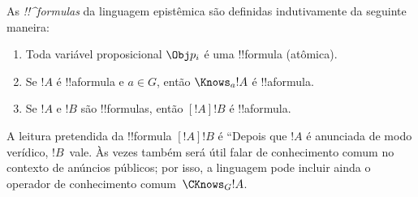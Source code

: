 \documentclass[../../../include/open-logic-section]{subfiles}
\begin{document}
\begin{defn}
  As \emph{!!^{formula}s} da linguagem epistêmica são definidas
  indutivamente da seguinte maneira:
  \begin{enumerate}


  \item Toda variável proposicional $\Obj p_i$ é uma !!{formula}
  (atômica).






  \item Se $!A$ é !!a{formula} e $a \in G$, então $\Knows_a !A$ é
  !!a{formula}.
  
  \item Se $!A$ e $!B$ são !!{formula}s, então $[!A] !B$ é !!a{formula}.

\end{enumerate}
\end{defn}

A leitura pretendida da !!{formula} $[!A] !B$ é ``Depois que $!A$ é
anunciada de modo verídico, $!B$~vale. Às vezes também será útil falar
de conhecimento comum no contexto de anúncios públicos; por isso, a
linguagem pode incluir ainda o operador de conhecimento comum~$\CKnows_G
!A$.
\end{document}
